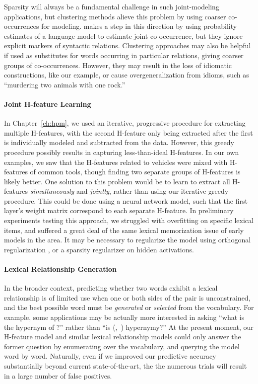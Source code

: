 Sparsity will always be a fundamental challenge in such joint-modeling
applications, but clustering methods alieve this problem by using coarser
co-occurrences for modeling.   makes a step in this
direction by using probability estimates of a language model to estimate joint
co-occurrence, but they ignore explicit markers of syntactic relations.
Clustering approaches may also be helpful if used as substitutes for words
occurring in particular relations, giving coarser groups of co-occurrences.
However, they may result in the loss of idiomatic constructions, like our example, or
cause overgeneralization from idioms, such as ``murdering two animals with one
rock.''

\paragraph{Joint H-feature Learning}

In Chapter~\ref{ch:hpm}, we used an iterative, progressive procedure for
extracting multiple H-features, with the second H-feature only being
extracted after the first is individually modeled and subtracted from the data.
However, this greedy procedure possibly results in capturing less-than-ideal H-features.
In our own examples, we saw that the H-features related to
vehicles were mixed with H-features of common tools, though finding two
separate groups of H-features is likely better. One solution to this problem would be
to learn to extract all H-features {\em simultaneously} and {\em jointly},
rather than using our iterative greedy procedure. This could be done using a
neural network model, such that the first layer's weight matrix
correspond to each separate H-feature. In preliminary experiments testing this
approach, we struggled with overfitting on specific lexical items, and suffered
a great deal of the same lexical memorization issue of early models in the
area. It may be necessary to regularize the model using orthogonal
regularization \cite{brock:2017:iclr}, or a sparsity regularizer on hidden
activations.

\paragraph{Lexical Relationship Generation}

In the broader context, predicting whether two words exhibit a lexical
relationship is of limited use when one or both sides of the pair
is unconstrained, and the best possible word must be {\em generated} or
{\em selected} from the vocabulary. For example, some applications may be
actually more interested in asking ``what is the hypernym of ?'' rather
than ``is (,~) hypernymy?'' At the present moment, our
H-feature model and similar lexical relationship models could only answer the
former question by enumerating over the vocabulary, and querying the model word
by word. Naturally, even if we improved our predictive accuracy substantially
beyond current state-of-the-art, the the numerous trials will result
in a large number of false positives.

